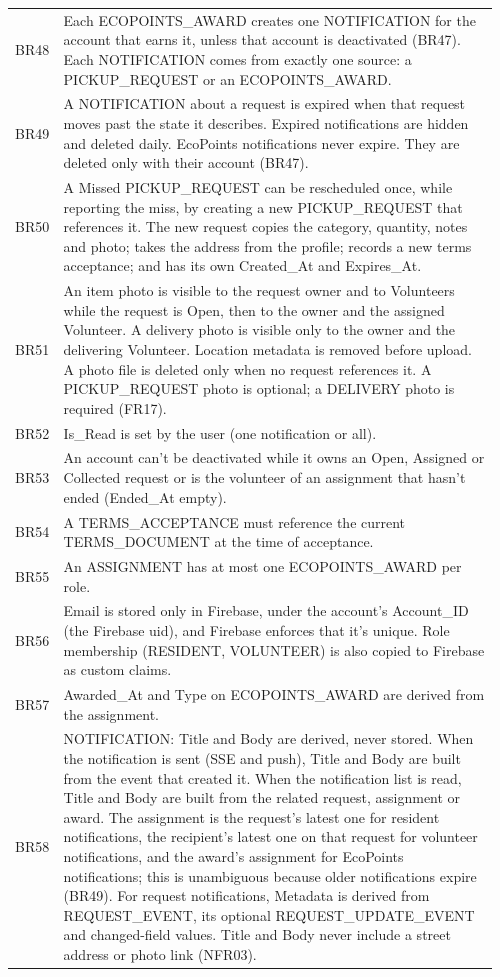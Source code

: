 \begin{longtable}{@{}p{0.07\linewidth}>{\raggedright\arraybackslash}p{0.89\linewidth}@{}}
\addlinespace[2pt]
BR48 & Each ECOPOINTS\_AWARD creates one NOTIFICATION for the account that earns it, unless that account is deactivated (BR47). Each NOTIFICATION comes from exactly one source: a PICKUP\_REQUEST or an ECOPOINTS\_AWARD. \\
\addlinespace[2pt]
BR49 & A NOTIFICATION about a request is expired when that request moves past the state it describes. Expired notifications are hidden and deleted daily. EcoPoints notifications never expire. They are deleted only with their account (BR47). \\
\addlinespace[2pt]
BR50 & A Missed PICKUP\_REQUEST can be rescheduled once, while reporting the miss, by creating a new PICKUP\_REQUEST that references it. The new request copies the category, quantity, notes and photo; takes the address from the profile; records a new terms acceptance; and has its own Created\_At and Expires\_At. \\
\addlinespace[2pt]
BR51 & An item photo is visible to the request owner and to Volunteers while the request is Open, then to the owner and the assigned Volunteer. A delivery photo is visible only to the owner and the delivering Volunteer. Location metadata is removed before upload. A photo file is deleted only when no request references it. A PICKUP\_REQUEST photo is optional; a DELIVERY photo is required (FR17). \\
\addlinespace[2pt]
BR52 & Is\_Read is set by the user (one notification or all). \\
\addlinespace[2pt]
BR53 & An account can't be deactivated while it owns an Open, Assigned or Collected request or is the volunteer of an assignment that hasn't ended (Ended\_At empty). \\
\addlinespace[2pt]
BR54 & A TERMS\_ACCEPTANCE must reference the current TERMS\_DOCUMENT at the time of acceptance. \\
\addlinespace[2pt]
BR55 & An ASSIGNMENT has at most one ECOPOINTS\_AWARD per role. \\
\addlinespace[2pt]
BR56 & Email is stored only in Firebase, under the account's Account\_ID (the Firebase uid), and Firebase enforces that it's unique. Role membership (RESIDENT, VOLUNTEER) is also copied to Firebase as custom claims. \\
\addlinespace[2pt]
BR57 & Awarded\_At and Type on ECOPOINTS\_AWARD are derived from the assignment. \\
\addlinespace[2pt]
BR58 & NOTIFICATION: Title and Body are derived, never stored. When the notification is sent (SSE and push), Title and Body are built from the event that created it. When the notification list is read, Title and Body are built from the related request, assignment or award. The assignment is the request's latest one for resident notifications, the recipient's latest one on that request for volunteer notifications, and the award's assignment for EcoPoints notifications; this is unambiguous because older notifications expire (BR49). For request notifications, Metadata is derived from REQUEST\_EVENT, its optional REQUEST\_UPDATE\_EVENT and changed-field values. Title and Body never include a street address or photo link (NFR03). \\

\end{longtable}
